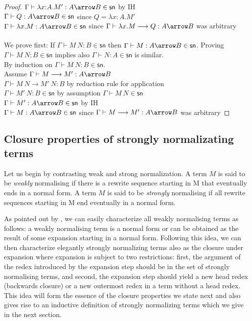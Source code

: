 \documentclass{article}
\newcommand{\csn}{\mathsf{sn}}
\newcommand{\red}{\longrightarrow}
\begin{document}
\begin{proof}
$\Gamma \vdash \lambda x{:}A.M' : A \arrow B\in \csn$ \hfill by IH \\
$\Gamma \vdash Q : A \arrow B \in \csn$ \hfill since $Q = \lambda x{:}A.M'$\\
$\Gamma \vdash \lambda x.M : A \arrow B \in \csn$ \hfill since $\Gamma \vdash \lambda x.M \red Q : A \arrow B$ was arbitrary
\\[1em]
\fbox{\ref{pp6}. If $\Gamma \vdash M~N : B \in \csn$
                 then $\Gamma \vdash M : A \arrow B \in \csn$ and $\Gamma \vdash N : A \in \csn$.}
\\[1em]
We prove first: If $\Gamma \vdash M~N : B\in \csn$ then $\Gamma \vdash M : A \arrow B\in \csn$.
Proving $\Gamma \vdash M~N : B \in \csn$ implies also $\Gamma \vdash N : A\in \csn$ is similar.
\\
By induction on $\Gamma \vdash M~N : B \in \csn$.
\\[1em]
Assume $\Gamma \vdash M \red M': A \arrow B $\\
$\Gamma \vdash M~N \red M'~N : B $ \hfill by reduction rule for application \\
$\Gamma \vdash M'~N : B \in \csn$ \hfill by assumption $\Gamma \vdash M~N \in \csn$\\
$\Gamma \vdash M' : A \arrow B \in \csn$ \hfill by IH\\
$\Gamma \vdash M  : A \arrow B \in \csn$ \hfill since $\Gamma \vdash M \red M' : A \arrow B$ was arbitrary

\end{proof}

\subsection*{Closure properties of strongly normalizating terms}

Let us begin by contrasting weak and strong normalization. A term $M$ is said to be \emph{weakly} normalising if there is a  rewrite sequence starting in M that eventually ends in a  normal form. A  term $M$ is said to be \emph{strongly} normalising if all rewrite sequences starting in M end eventually in a  normal form.

As pointed out by \cite{Raamsdonk_onnormalisation}, we can easily characterize all weakly normalising terms as follows: a  weakly normalising term is a normal form or can be obtained as the result of some expansion starting in a  normal form. Following this idea, we can then characterize elegantly strongly normalizing terms also as the closure under expansion where expansion is subject to two restrictions: first, the argument of the redex introduced by the expansion step should be in the set of strongly normalising terms, and second, the expansion step should yield a new head redex (backwards closure) or a  new outermost redex in a  term without a  head redex. This idea will form the essence of the closure properties we state next and also gives rise to an inductive definition of strongly normalizing terms which we give in the next section.
\end{document}
